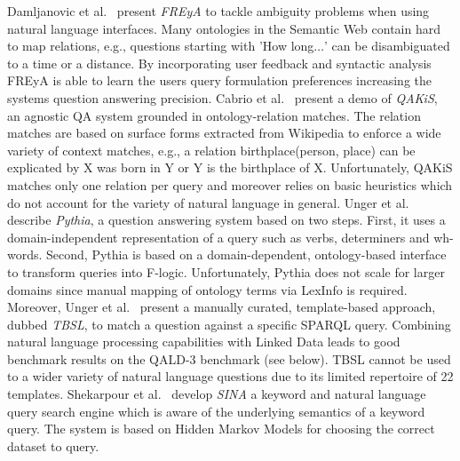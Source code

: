 {Damljanovic et al.~\cite{freya}} present \emph{FREyA} to tackle ambiguity problems when using natural language interfaces. 
Many ontologies in the Semantic Web contain hard to map relations, e.g., questions starting with 'How long$\ldots$' can be disambiguated to a time or a distance. 
By incorporating user feedback and syntactic analysis FREyA is able to learn the users query formulation preferences increasing the systems question answering precision. 
{Cabrio et al.~\cite{qakis}} present a demo of \emph{QAKiS}, an agnostic QA system grounded in ontology-relation matches. 
The relation matches are based on surface forms extracted from Wikipedia to enforce a wide variety of context matches, e.g., a relation birthplace(person, place) can be explicated by X was born in Y or Y is the birthplace of X. 
Unfortunately, QAKiS matches only one relation per query and moreover relies on basic heuristics which do not account for the variety of natural language in general.
{Unger et al.~\cite{pythia}} describe \emph{Pythia}, a question answering system based on two steps.
First, it uses a domain-independent representation of a query such as verbs, determiners and wh-words.
Second, Pythia is based on a domain-dependent, ontology-based interface to transform queries into F-logic.
Unfortunately, Pythia does not scale for larger domains since manual mapping of ontology terms via LexInfo is required.
Moreover, Unger et al.~\cite{template} present a manually curated, template-based approach, dubbed \emph{TBSL}, to match a question against a specific SPARQL query. 
Combining natural language processing capabilities with Linked Data leads to good benchmark results on the QALD-3 benchmark (see below).
TBSL cannot be used to a wider variety of natural language questions due to its limited repertoire of 22 templates.
{Shekarpour et al.~\cite{SINA_WebSemantic}} develop \emph{SINA} a keyword and natural language query search engine which is aware of the underlying semantics of a keyword query. 
The system is based on Hidden Markov Models for choosing the correct dataset to query.
